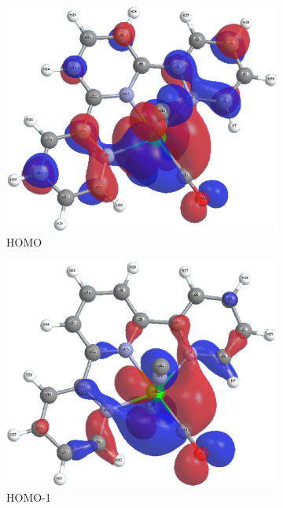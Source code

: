\begin{figure}[!ht]
\begin{subfigure}[b]{0.31\textwidth}
  \includegraphics[clip=true, width=\textwidth, keepaspectratio]{images/mos/6h.eps}
  \caption{HOMO}
 \end{subfigure}
 \begin{subfigure}[b]{0.31\textwidth}
  \includegraphics[clip=true, width=\textwidth, keepaspectratio]{images/mos/6h-1.eps}
  \caption{HOMO-1}
 \end{subfigure}
 \begin{subfigure}[b]{0.31\textwidth}

\end{subfigure}
\end{figure}
